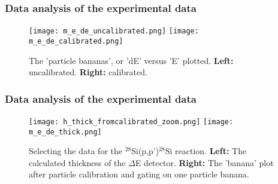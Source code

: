 \documentclass{beamer}              %
\begin{document}
\begin{frame}
\end{frame}

\begin{frame}
\frametitle{Data analysis of the experimental data}
\begin{figure}[htp]
\centering
\texttt{[image: m\_e\_de\_uncalibrated.png]}
\texttt{[image: m\_e\_de\_calibrated.png]} 
\caption{The 'particle bananas', or 'dE' versus 'E' plotted. \textbf{Left:} uncalibrated. \textbf{Right:} calibrated.}%
\label{fig: de_e}
\end{figure}
\end{frame}

\begin{frame}
\frametitle{Data analysis of the experimental data}
\begin{figure}[htp]
\centering 
\texttt{[image: h\_thick\_fromcalibrated\_zoom.png]}
\texttt{[image: m\_e\_de\_thick.png]}
\caption{Selecting the data for the ${}^{28}$Si(p,p')$^{28}$Si reaction. \textbf{Left:} The calculated thickness of the $\Delta$E detector. \textbf{Right:} The 'banana' plot after particle calibration and gating on one particle banana.}
\label{fig: banana_gate}
\end{figure}
\end{frame}
\end{document}
